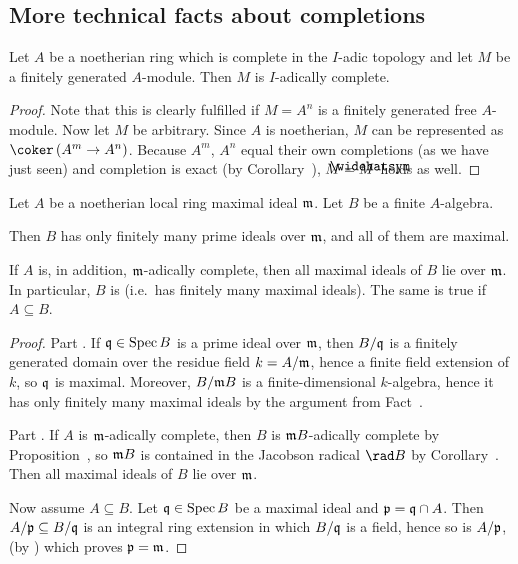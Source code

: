 \documentclass[a4paper,parskip=half,numbers=enddot, DIV=12]{scrreprt}
\begin{document}
%
\subsection{More technical facts about completions}
\begin{prop}
	Let $A$ be a noetherian ring which is complete in the $I$-adic topology and let $M$ be a finitely generated $A$-module. Then $M$ is $I$-adically complete.
\end{prop}
\begin{proof}
	Note that this is clearly fulfilled if $M=A^n$ is a finitely generated free $A$-module. Now let $M$ be arbitrary. Since $A$ is noetherian, $M$ can be represented as $\coker\left(A^m\morphism A^n\right)$. Because $A^m$, $A^n$ equal their own completions (as we have just seen) and  completion is exact (by Corollary~), $M=\roof{M}$ holds as well.
\end{proof}
\begin{cor}
	Let $A$ be a noetherian local ring maximal ideal $\mathfrak{m}$. Let $B$ be a finite $A$-algebra.
	\begin{alphanumerate}
		\item Then $B$ has only finitely many prime ideals over $\mathfrak{m}$, and all of them are maximal.
		\item If $A$ is, in addition, $\mathfrak{m}$-adically complete, then all maximal ideals of $B$ lie over $\mathfrak{m}$. In particular, $B$ is  (i.e.\ has finitely many maximal ideals). The same is true if $A\subseteq B$.
	\end{alphanumerate}
\end{cor}
\begin{proof}
	Part . If $\mathfrak{q}\in\operatorname{Spec} B$ is a prime ideal over $\mathfrak{m}$, then $B/\mathfrak{q}$ is a finitely generated domain over the residue field $k=A/\mathfrak{m}$, hence a finite field extension of $k$, so $\mathfrak{q}$ is maximal. Moreover, $B/\mathfrak{m} B$ is a finite-dimensional $k$-algebra, hence it has only finitely many maximal ideals by the argument from Fact~.
	
	Part . If $A$ is $\mathfrak{m}$-adically complete, then $B$ is $\mathfrak{m} B$-adically complete by Proposition~, so $\mathfrak{m} B$ is contained in the Jacobson radical $\rad B$ by Corollary~. Then all maximal ideals of $B$ lie over $\mathfrak{m}$.
	
	Now assume $A\subseteq B$. Let $\mathfrak{q}\in\operatorname{Spec} B$ be a maximal ideal and $\mathfrak{p}=\mathfrak{q}\cap A$. Then $A/\mathfrak{p}\subseteq B/\mathfrak{q}$ is an integral ring extension in which $B/\mathfrak{q}$ is a field, hence so is $A/\mathfrak{p}$, (by \cite[Proposition~1.5.1]{alg1}) which proves $\mathfrak{p}=\mathfrak{m}$.
\end{proof}
\end{document}
